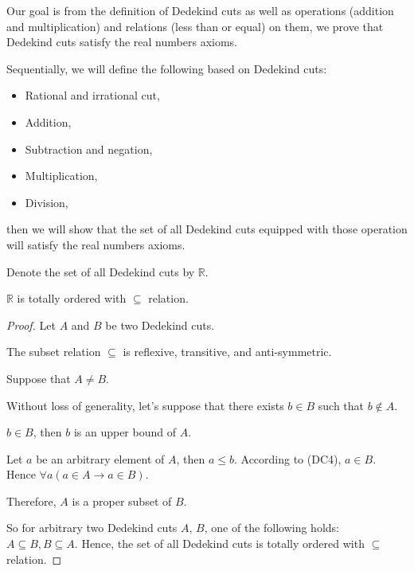 \par Our goal is from the definition of Dedekind cuts as well as operations (addition and multiplication) and relations (less than or equal) on them, we prove that Dedekind cuts satisfy the real numbers axioms.

\par Sequentially, we will define the following based on Dedekind cuts:
\begin{itemize}
    \item Rational and irrational cut,
    \item Addition,
    \item Subtraction and negation,
    \item Multiplication,
    \item Division,
\end{itemize}
\par then we will show that the set of all Dedekind cuts equipped with those operation will satisfy the real numbers axioms.

\par Denote the set of all Dedekind cuts by $\mathbb{R}$.

\begin{theorem}
    $\mathbb{R}$ is totally ordered with $\subseteq$ relation.
\end{theorem}

\begin{proof}
    \par Let $A$ and $B$ be two Dedekind cuts.
    \par The subset relation $\subseteq$ is reflexive, transitive, and anti-symmetric.
    \bigskip
    \par Suppose that $A\ne B$.
    \par Without loss of generality, let's suppose that there exists $b\in B$ such that $b\notin A$.
    \par $b\in B$, then $b$ is an upper bound of $A$.
    \par Let $a$ be an arbitrary element of $A$, then $a\le b$. According to (DC4), $a\in B$. Hence $\forall a(a\in A\rightarrow a\in B)$.
    \par Therefore, $A$ is a proper subset of $B$.
    \bigskip
    \par So for arbitrary two Dedekind cuts $A$, $B$, one of the following holds: $A\subseteq B, B\subseteq A$. Hence, the set of all Dedekind cuts is totally ordered with $\subseteq$ relation.
\end{proof}

